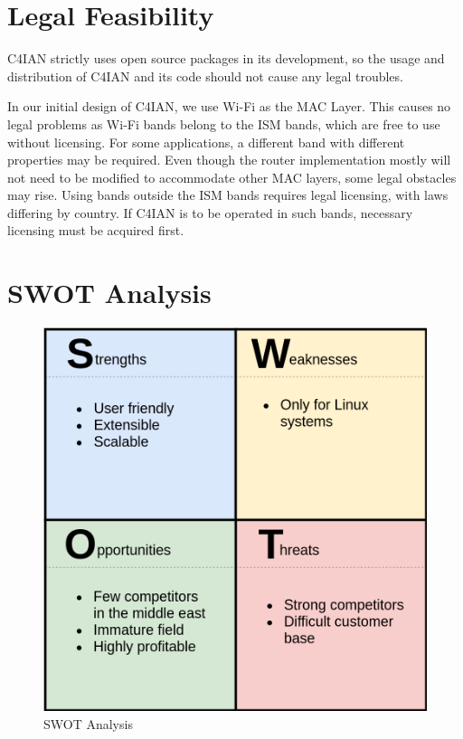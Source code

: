 \section{Legal Feasibility}

\quad C4IAN strictly uses open source packages in its development, so the usage and distribution of C4IAN and its code should not cause any legal troubles.

In our initial design of C4IAN, we use Wi-Fi as the MAC Layer. This causes no legal problems as Wi-Fi bands belong to the ISM bands, which are free to use without licensing. For some applications, a different band with different properties may be required. Even though the router implementation mostly will not need to be modified to accommodate other MAC layers, some legal obstacles may rise. Using bands outside the ISM bands requires legal licensing, with laws differing by country. If C4IAN is to be operated in such bands, necessary licensing must be acquired first.

\section{SWOT Analysis}

\begin{figure}[!htb]
    \centering
    \includegraphics[width=0.8\linewidth]{images/swot.png}
    \caption{SWOT Analysis}
    \label{fig:swot}
\end{figure}